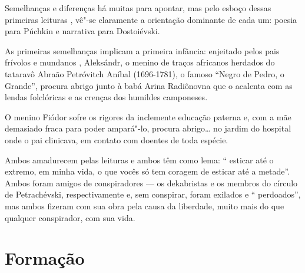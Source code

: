 Semelhanças e diferenças há muitas para apontar, mas pelo esboço dessas
primeiras leituras , vê"-se claramente a orientação dominante de cada um:
poesia para Púchkin e narrativa para Dostoiévski.

As primeiras semelhanças implicam a primeira infância: enjeitado pelos
pais frívolos e mundanos , Aleksándr, o menino de traços africanos
herdados do tataravô Abraão Petróvitch Aníbal (1696-1781), o famoso
``Negro de Pedro, o Grande'', procura abrigo junto à babá Arina
Radiônovna que o acalenta com as lendas folclóricas e as crenças dos
humildes camponeses.

O menino Fiódor sofre os rigores da inclemente educação paterna e, com a
mãe demasiado fraca para poder ampará"-lo, procura abrigo\ldots{} no jardim do
hospital onde o pai clinicava, em contato com doentes de toda espécie.

Ambos amadurecem pelas leituras e ambos têm como lema: `` esticar até o
extremo, em minha vida, o que vocês só tem coragem de esticar até a
metade''. Ambos foram amigos de conspiradores --- os dekabristas e os
membros do círculo de Petrachévski, respectivamente e, sem conspirar,
foram exilados e `` perdoados'', mas ambos fizeram com sua obra pela
causa da liberdade, muito mais do que qualquer conspirador, com sua
vida.

\section{Formação}

